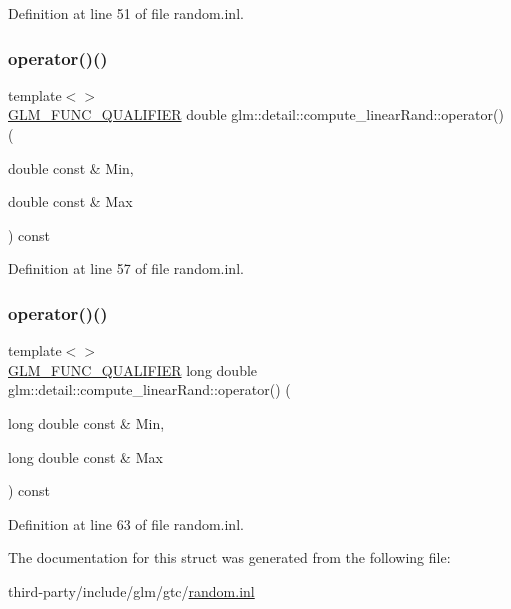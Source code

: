 Definition at line 51 of file random.\+inl.

\mbox{\label{structglm_1_1detail_1_1compute__linear_rand_ad45fc4e214a3d1666353c3b800b397d3}} 
\subsubsection{\texorpdfstring{operator()()}{operator()()}\hspace{0.1cm}{\footnotesize\ttfamily [3/4]}}
{\footnotesize\ttfamily template$<$$>$ \\
\hyperlink{setup_8hpp_a33fdea6f91c5f834105f7415e2a64407}{G\+L\+M\+\_\+\+F\+U\+N\+C\+\_\+\+Q\+U\+A\+L\+I\+F\+I\+ER} double glm\+::detail\+::compute\+\_\+linear\+Rand\+::operator() (\begin{DoxyParamCaption}\item[{double const \&}]{Min,  }\item[{double const \&}]{Max }\end{DoxyParamCaption}) const}



Definition at line 57 of file random.\+inl.

\mbox{\label{structglm_1_1detail_1_1compute__linear_rand_a8d1b547abeceffe6d4566da1c68a28c8}} 
\subsubsection{\texorpdfstring{operator()()}{operator()()}\hspace{0.1cm}{\footnotesize\ttfamily [4/4]}}
{\footnotesize\ttfamily template$<$$>$ \\
\hyperlink{setup_8hpp_a33fdea6f91c5f834105f7415e2a64407}{G\+L\+M\+\_\+\+F\+U\+N\+C\+\_\+\+Q\+U\+A\+L\+I\+F\+I\+ER} long double glm\+::detail\+::compute\+\_\+linear\+Rand\+::operator() (\begin{DoxyParamCaption}\item[{long double const \&}]{Min,  }\item[{long double const \&}]{Max }\end{DoxyParamCaption}) const}



Definition at line 63 of file random.\+inl.



The documentation for this struct was generated from the following file\+:\begin{DoxyCompactItemize}
\item 
third-\/party/include/glm/gtc/\hyperlink{random_8inl}{random.\+inl}\end{DoxyCompactItemize}
